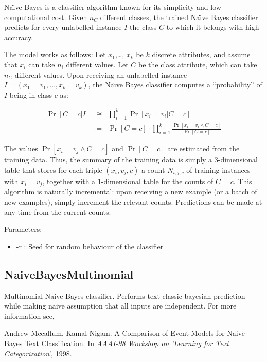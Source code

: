 \documentclass[a4paper,12pt,twoside]{book}
\begin{document}
Na\"{\i}ve Bayes is a classifier algorithm known for its simplicity and low computational cost.
Given $n_C$ different classes, the trained Na\"{\i}ve Bayes classifier %
predicts for every unlabelled instance $I$  %
the class $C$ to which it belongs with high accuracy. 

The model works as follows: Let $x_1$,\dots, $x_k$ be $k$ discrete attributes, and 
assume that $x_i$ can take $n_i$ different values. Let $C$
be the class attribute, which can take $n_C$ different values. %
Upon receiving an unlabelled 
instance $I=(x_1=v_1, \dots, x_k=v_k)$, the Na\"{\i}ve Bayes classifier
computes a ``probability'' of $I$ being in class $c$ as: 

\begin{eqnarray*}
\Pr[C=c|I] &\cong& \prod_{i=1}^k \Pr[x_i=v_i|C=c] \\
           &=& \Pr[C=c] \cdot \prod_{i=1}^k \frac{\Pr[x_i=v_i \wedge C=c]}{\Pr[C=c]} 
\end{eqnarray*}

The values $\Pr[x_i=v_j \wedge C=c]$ and $\Pr[C=c]$ are estimated from 
the training data. Thus, the summary of the training data
is simply a 3-dimensional table that stores for each triple 
$(x_i,v_j,c)$ a count $N_{i,j,c}$ of training instances with $x_i=v_j$, 
together with a 1-dimensional table for the counts of $C=c$. 
This algorithm is naturally incremental: upon receiving a new example 
(or a batch of new examples), 
simply increment the relevant counts. Predictions can be made  
at any time from the current counts. 

Parameters:

\begin{itemize}
\item -r : Seed for random behaviour of the classifier
\end{itemize}

\subsection{NaiveBayesMultinomial}
 Multinomial Naive Bayes classifier. Performs text classic bayesian prediction while making naive assumption that all inputs are independent.
 For more information see,
 \begin{itemize}
 Andrew Mccallum, Kamal Nigam.
\newblock A Comparison of Event Models for Naive Bayes Text Classification.
\newblock In {\em AAAI-98 Workshop on 'Learning for Text Categorization'}, 1998.
\end{itemize}
\end{document}
